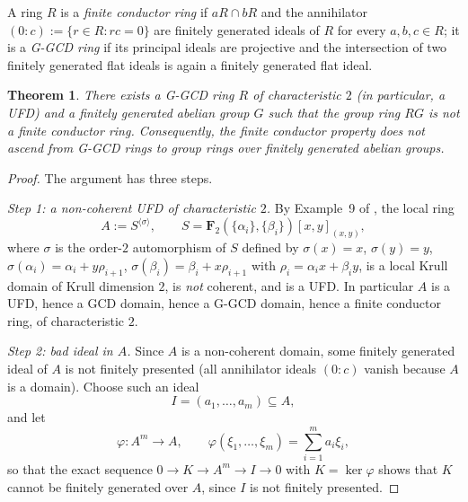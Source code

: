 \documentclass[11pt,reqno]{amsart}
\numberwithin{equation}{section}
\newtheorem{theorem}[thm]{Theorem}
\theoremstyle{definition}
\begin{document}
A ring $R$ is a \emph{finite conductor ring} if $aR\cap bR$ and the
annihilator $(0:c):=\{r\in R:rc=0\}$ are finitely generated ideals of
$R$ for every $a,b,c\in R$; it is a \emph{G-GCD ring} if its principal
ideals are projective and the intersection of two finitely generated
flat ideals is again a finitely generated flat ideal.

\begin{theorem}\label{thm:4ai}
There exists a G-GCD ring $R$ of characteristic $2$ (in particular,
a UFD) and a finitely generated abelian group $G$ such that the group
ring $RG$ is not a finite conductor ring. Consequently, the finite
conductor property does not ascend from G-GCD rings to group rings over
finitely generated abelian groups.
\end{theorem}

\begin{proof}
The argument has three steps.

\smallskip
\noindent\emph{Step 1: a non-coherent UFD of characteristic $2$.}
By Example~9 of \cite{Glaz2000-FCRZD}, the local ring
\[
   A:=S^{\langle\sigma\rangle},\qquad
   S=\mathbf F_2(\{\alpha_i\},\{\beta_i\})[x,y]_{(x,y)},
\]
where $\sigma$ is the order-$2$ automorphism of $S$ defined by
$\sigma(x)=x$, $\sigma(y)=y$, $\sigma(\alpha_i)=\alpha_i+y\rho_{i+1}$,
$\sigma(\beta_i)=\beta_i+x\rho_{i+1}$ with
$\rho_i=\alpha_i x+\beta_i y$, is a local Krull domain of Krull
dimension $2$, is \emph{not} coherent, and is a UFD. In particular $A$
is a UFD, hence a GCD domain, hence a G-GCD domain, hence a finite
conductor ring, of characteristic $2$.

\smallskip
\noindent\emph{Step 2: bad ideal in $A$.}
Since $A$ is a non-coherent domain, some finitely generated ideal of $A$
is not finitely presented (all annihilator ideals $(0:c)$ vanish because
$A$ is a domain). Choose such an ideal
\[
   I=(a_1,\dots,a_m)\subseteq A,
\]
and let
\[
   \varphi\colon A^m\to A,\qquad
   \varphi(\xi_1,\dots,\xi_m)=\sum_{i=1}^m a_i\xi_i,
\]
so that the exact sequence $0\to K\to A^m\to I\to 0$ with $K=\ker\varphi$
shows that $K$ cannot be finitely generated over $A$, since $I$ is not
finitely presented.


\end{proof}
\end{document}
